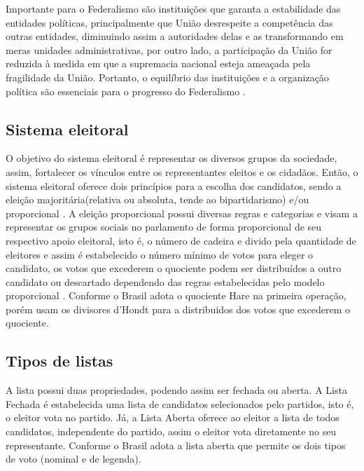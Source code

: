 Importante para o Federalismo são instituições que garanta a estabilidade das entidades políticas, principalmente que União desrespeite a competência das outras entidades, diminuindo assim a autoridades delas e as transformando em meras unidades administrativas, por outro lado, a participação da União for reduzida à medida em que a supremacia nacional esteja ameaçada pela fragilidade da União.
Portanto, o equilíbrio das instituições e a organização política são essenciais para o progresso do Federalismo \cite{leonardo_avritzer_2006}.


\subsection{Sistema eleitoral}

O objetivo do sistema eleitoral é representar os diversos grupos da sociedade, assim, fortalecer os vínculos entre os representantes eleitos e os cidadãos.
Então, o sistema eleitoral oferece dois princípios para a escolha dos candidatos, sendo a eleição majoritária(relativa ou absoluta, tende ao bipartidarismo) e/ou proporcional \cite{leonardo_avritzer_2006}.
A eleição proporcional possui diversas regras e categorias e visam a representar os grupos sociais no parlamento de forma proporcional de seu respectivo apoio eleitoral, isto é, o número de cadeira e divido pela quantidade de eleitores e assim é estabelecido o número mínimo de votos para eleger o candidato, os votos que excederem o quociente podem ser distribuídos a outro candidato ou descartado dependendo das regras estabelecidas pelo modelo proporcional \cite{leonardo_avritzer_2006}.
Conforme \cite{leonardo_avritzer_2006} o Brasil adota o quociente Hare na primeira operação, porém usam os divisores d'Hondt para a distribuidos dos votos que excederem o quociente.


\subsection{Tipos de listas}

A lista possui duas propriedades, podendo assim ser fechada ou aberta.
A Lista Fechada é estabelecida uma lista de candidatos selecionados pelo partidos, isto é, o eleitor vota no partido.
Já, a Lista Aberta oferece ao eleitor a lista de todos candidatos, independente do partido, assim o eleitor vota diretamente no seu representante.
Conforme \cite{leonardo_avritzer_2006} o Brasil adota a lista aberta que permite os dois tipos de voto (nominal e de legenda).


